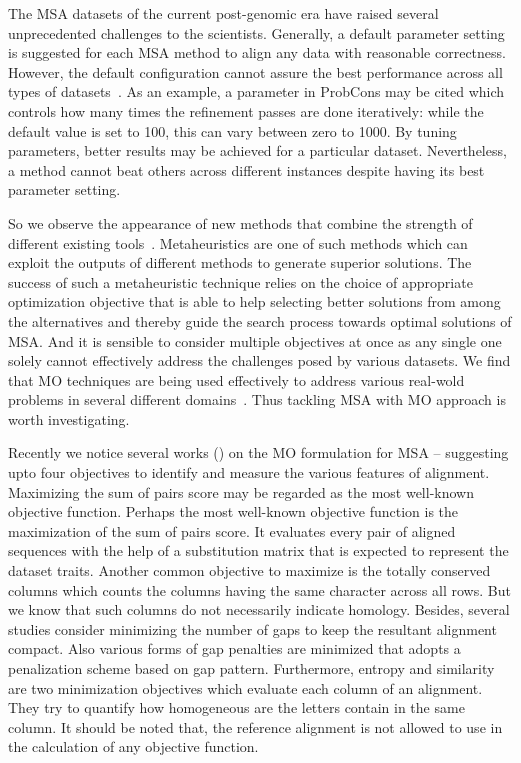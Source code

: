 The MSA datasets of the current post-genomic era have raised several unprecedented challenges to the scientists. Generally, a default parameter setting is suggested for each MSA method to align any data with reasonable correctness. However, the default configuration cannot assure the best performance across all types of datasets~\citep{rubio2018characteristic}. As an example, a parameter in ProbCons may be cited which controls how many times the refinement passes are done iteratively: while the default value is set to 100, this can vary between zero to 1000. By tuning parameters, better results may be achieved for a particular dataset. Nevertheless, a method cannot beat others across different instances despite having its best parameter setting. 

So we observe the appearance of new methods that combine the strength of different existing tools~\citep{thompson2011comprehensive}. Metaheuristics are one of such methods which can exploit the outputs of different methods to generate superior solutions. The success of such a metaheuristic technique relies on the choice of appropriate optimization objective that is able to help selecting better solutions from among the alternatives and thereby guide the search process towards optimal solutions of MSA. And it is sensible to consider multiple objectives at once as any single one solely cannot effectively address the challenges posed by various datasets. We find that MO techniques are being used effectively to address various real-wold problems in several different domains~\cite{8955943, 9098079, 8984353, 8842602}.
Thus tackling MSA with MO approach is worth investigating.


Recently we notice several works (\citep{da2010alineaga, ortuno2013optimizing, soto2014multi, abbasi2015local, rubio2016hybrid,zambrano2017comparing, rubio2018characteristic}) on the MO formulation for MSA – suggesting upto four objectives to identify and measure the various features of alignment. Maximizing the sum of pairs score may be regarded as the most well-known objective function.
Perhaps the most well-known objective function is the maximization of the sum of pairs score. It evaluates every pair of aligned sequences with the help of a substitution matrix that is expected to represent the dataset traits. Another common  objective to maximize is the totally conserved columns which counts the columns having the same character across all rows. But we know that such columns do not necessarily indicate homology.
Besides, several studies consider minimizing the number of gaps to keep the resultant alignment compact. Also various forms of gap penalties are minimized that adopts a penalization scheme based on gap pattern. Furthermore, entropy and similarity are two minimization objectives which evaluate each column of an alignment. They try to quantify how homogeneous are the letters contain in the same column. It should be noted that, the reference alignment is not allowed to use in the calculation of any objective function. 

